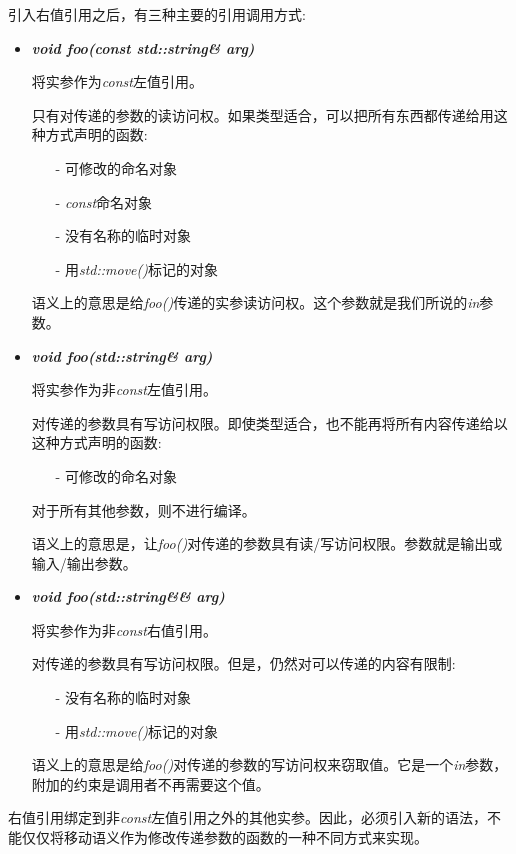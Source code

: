 引入右值引用之后，有三种主要的引用调用方式:\par

\begin{itemize}
	\item \textit{\textbf{void foo(const std::string\& arg)}}\par
	将实参作为\textit{const}左值引用。\par
	只有对传递的参数的读访问权。如果类型适合，可以把所有东西都传递给用这种方式声明的函数:\par
	\begin{itemize}
		\item[-] 可修改的命名对象
		\item[-] \textit{const}命名对象
		\item[-] 没有名称的临时对象
		\item[-] 用\textit{std::move()}标记的对象
	\end{itemize}
	语义上的意思是给\textit{foo()}传递的实参读访问权。这个参数就是我们所说的\textit{in}参数。
	\item \textit{\textbf{void foo(std::string\& arg)}}\par
	将实参作为非\textit{const}左值引用。\par
	对传递的参数具有写访问权限。即使类型适合，也不能再将所有内容传递给以这种方式声明的函数:\par
	\begin{itemize}
		\item[-] 可修改的命名对象
	\end{itemize}
	对于所有其他参数，则不进行编译。\par
	语义上的意思是，让\textit{foo()}对传递的参数具有读/写访问权限。参数就是输出或输入/输出参数。\par
	\item \textit{\textbf{void foo(std::string\&\& arg)}}\par
	将实参作为非\textit{const}右值引用。\par
	对传递的参数具有写访问权限。但是，仍然对可以传递的内容有限制:\par
	\begin{itemize}
		\item[-] 没有名称的临时对象
		\item[-] 用\textit{std::move()}标记的对象
	\end{itemize}
	语义上的意思是给\textit{foo()}对传递的参数的写访问权来窃取值。它是一个\textit{in}参数，附加的约束是调用者不再需要这个值。
\end{itemize}

右值引用绑定到非\textit{const}左值引用之外的其他实参。因此，必须引入新的语法，不能仅仅将移动语义作为修改传递参数的函数的一种不同方式来实现。\par

